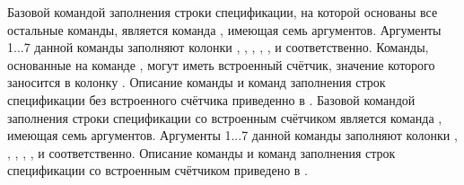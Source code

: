 Базовой командой заполнения строки спецификации, на которой основаны все остальные
команды, является команда , имеющая семь
аргументов. Аргументы 1...7 данной команды заполняют колонки
\colorbox{resultcolor}{}, \colorbox{resultcolor}{},
\colorbox{resultcolor}{}, \colorbox{resultcolor}{},
\colorbox{resultcolor}{}, \colorbox{resultcolor}{} и
\colorbox{resultcolor}{} соответственно. Команды, основанные на
команде , могут иметь встроенный счётчик, значение которого
заносится в колонку \colorbox{resultcolor}{}. Описание команды
 и команд заполнения строк спецификации без встроенного
счётчика приведенно в . Базовой командой
заполнения строки спецификации со встроенным счётчиком является команда
, имеющая семь аргументов. Аргументы 1...7 данной
команды заполняют колонки \colorbox{resultcolor}{},
\colorbox{resultcolor}{}, \colorbox{resultcolor}{},
\colorbox{resultcolor}{},
\colorbox{resultcolor}{}, \colorbox{resultcolor}{} и
\colorbox{resultcolor}{} соответственно. Описание команды
 и команд заполнения строк спецификации со встроенным
счётчиком приведено в .

\newpage

